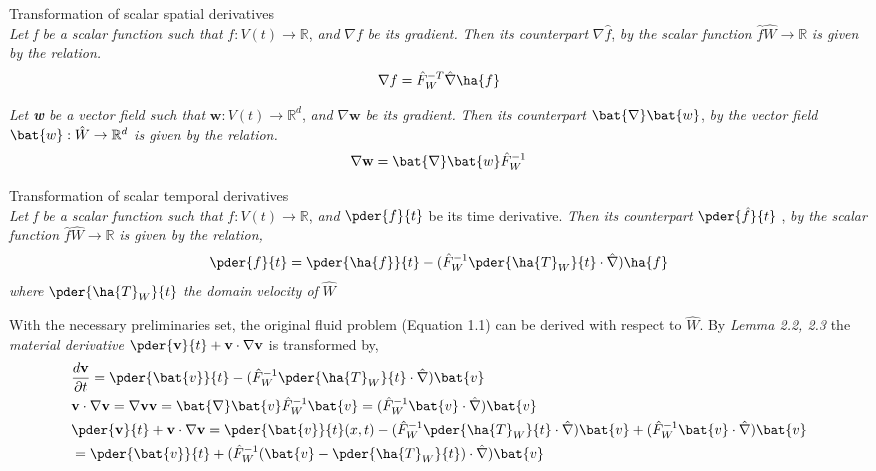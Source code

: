 \begin{lem}
Transformation of scalar spatial derivatives \\
\textit{Let f be a scalar function such that} $f: V(t) \rightarrow \mathbb{R}$, \textit{and} $\nabla f$ \textit{be its gradient.}
\textit{Then its counterpart} $\nabla \hat{f}$, \textit{by the scalar function}  $\hat{f} \hat{W} \rightarrow \mathbb{R}$ \textit{is given by the relation.} 
\begin{align}
\nabla f = \hat{F}_W^{-T} \hat{\nabla}\ha{f}
\end{align} 
\end{lem}
\begin{lem}
\textit{Let \textbf{w} be a vector field such that} $\mathbf{w}: V(t) \rightarrow \mathbb{R}^d$, \textit{and} $\nabla \mathbf{w}$ \textit{be its gradient.}
\textit{Then its counterpart} $\bat{\nabla}\bat{w}$, \textit{by the vector field}  $\bat{w}: \hat{W} \rightarrow \mathbb{R}^d$ \textit{is given by the relation.} 
\begin{align}
\nabla \mathbf{w} = \bat{\nabla}\bat{w} \hat{F}_W^{-1} 
\end{align} 
\end{lem}
\begin{lem}
Transformation of scalar temporal derivatives \\
\textit{Let f be a scalar function such that} $f: V(t) \rightarrow \mathbb{R}$, \textit{and} $\pder{f}{t}$ be its time derivative. \textit{Then its counterpart} $\pder{\hat{f}}{t}$ , \textit{by the scalar function}  $\hat{f} \hat{W} \rightarrow \mathbb{R}$ \textit{is given by the relation,} 
\begin{align}
\pder{f}{t} = \pder{\ha{f} }{t} - (\hat{F}_W^{-1} \pder{\ha{T}_W}{t} \cdot \hat{\nabla}) \ha{f}
\end{align}
 \textit{where} $\pder{\ha{T}_W}{t}$ \textit{the domain velocity of}  $\hat{W}$
\end{lem}
With the necessary preliminaries set, the original fluid problem (Equation 1.1) can be derived with respect to $\hat{W}$. By \textit{Lemma 2.2, 2.3}  the \textit{material derivative} $\pder{\mathbf{v}}{t} + \mathbf{v} \cdot \nabla \mathbf{v}$ is transformed by, 
\begin{align}
&\frac{d \mathbf{v}}{\partial t} = 
\pder{\bat{v}}{t} - (\hat{F}_W^{-1}\pder{\ha{T}_W}{t} \cdot \hat{\nabla})\bat{v} \\
&\mathbf{v} \cdot \nabla \mathbf{v} = \nabla \mathbf{v} \mathbf{v} = 
\bat{\nabla}\bat{v}\hat{F}_W^{-1}\bat{v} = (\hat{F}_W^{-1}\bat{v} \cdot \hat{\nabla})\bat{v} \\
&\pder{\mathbf{v}}{t} + \mathbf{v} \cdot \nabla \mathbf{v} = 
\pder{\bat{v}}{t}(x,t) - (\hat{F}_W^{-1}\pder{\ha{T}_W}{t} \cdot \hat{\nabla})\bat{v}
+ (\hat{F}_W^{-1}\bat{v} \cdot \hat{\nabla})\bat{v}  \\
&= \pder{\bat{v}}{t} + (\hat{F}_W^{-1}(\bat{v} - \pder{\ha{T}_W}{t}) \cdot \hat{\nabla}) \bat{v}
\end{align}
